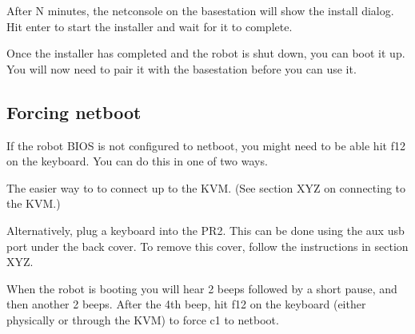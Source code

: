 After N minutes, the netconsole on the basestation will show the
install dialog.  Hit enter to start the installer and wait for it to
complete.

Once the installer has completed and the robot is shut down, you can
boot it up.  You will now need to pair it with the basestation before
you can use it.

\subsection{Forcing netboot}

If the robot BIOS is not configured to netboot, you might need to be
able hit f12 on the keyboard.  You can do this in one of two ways.

The easier way to to connect up to the KVM.  (See section XYZ on connecting to the KVM.)

Alternatively, plug a keyboard into the PR2.  This can be done using
the aux usb port under the back cover.  To remove this cover, follow
the instructions in section XYZ.

When the robot is booting you will hear 2 beeps followed by a short
pause, and then another 2 beeps.  After the 4th beep, hit f12 on the
keyboard (either physically or through the KVM) to force c1 to netboot.

